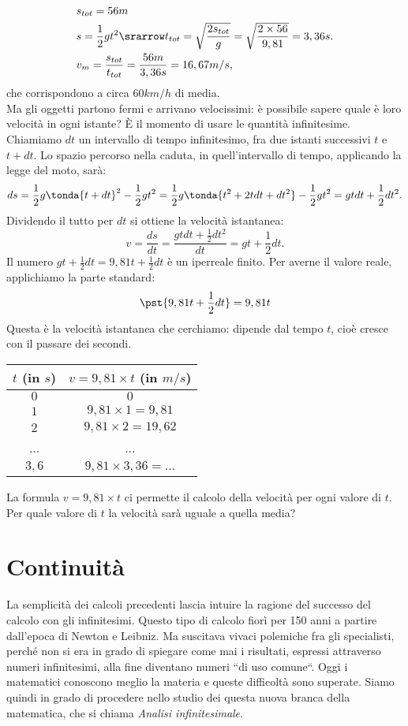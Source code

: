 \begin{align*}
 & s_{tot} = 56m\\
 & s =\frac{1}{2}gt^2 \srarrow t_{tot}= \sqrt{\frac{2s_{tot}}{g}}=
 \sqrt{\frac{2\times 56}{9,81}}=3,36 s.\\
 & v_m= \frac{s_{tot}}{t_{tot}}=\frac{56 m}{3,36 s}=16,67 m/s,
\end{align*}
che corrispondono a circa $60 km/h$ di media.\\
Ma gli oggetti partono fermi e arrivano velocissimi: 
è possibile sapere quale è loro velocità in ogni istante? È il momento
di usare le quantità infinitesime.\\
Chiamiamo $dt$ un intervallo di tempo infinitesimo, fra due istanti successivi
$t$ e $t+dt$.
Lo spazio percorso nella caduta, in quell'intervallo di tempo, applicando la legge del 
moto, sarà:
\[
 ds=\frac{1}{2}g\tonda{t+dt}^2-\frac{1}{2}gt^2=
 \frac{1}{2}g\tonda{t^2+2tdt+dt^2}-\frac{1}{2}gt^2=
 gtdt+\frac{1}{2}dt^2. 
\]
Dividendo il tutto per $dt$ si ottiene la velocità istantanea:
\[
 v=\frac{ds}{dt}=\frac{gtdt+\frac{1}{2}dt^2}{dt}=gt+\frac{1}{2}dt.
\]
Il numero $gt+\frac{1}{2}dt=9,81t+\frac{1}{2}dt$ è un iperreale finito. 
Per averne il valore reale, applichiamo la parte standard:
\[
 \pst{9,81t+\frac{1}{2}dt}=9,81t
\]
Questa è la velocità istantanea che cerchiamo: dipende dal tempo $t$,
cioè cresce con il passare dei secondi. 

\begin{center}
\begin{tabular}{cc}\toprule
$t$ (in $s$) & $v=9,81\times t$ (in $m/s$) \\\midrule
$0$ & $0$  \\
$1$ & $9,81\times 1 =9,81$ \\
$2$ & $9,81\times 2 =19,62$ \\
... & ... \\
$3,6$ & $9,81\times 3,36= ...$\\\bottomrule
\end{tabular}
\label{tab:diff_velocita}
\end{center}

La formula $v=9,81\times t$ ci permette il calcolo della velocità per ogni valore di $t$.
Per quale valore di \(t\) la velocità sarà uguale a quella media? 


\section{Continuità}
\label{04_diffcomtinuità}
La semplicità dei calcoli precedenti lascia intuire la ragione del successo del
calcolo con gli infinitesimi.  Questo tipo di calcolo fiorì per 150 anni a 
partire dall'epoca di Newton e Leibniz. Ma suscitava vivaci polemiche fra
gli specialisti, perché non si era in grado di spiegare come mai i 
risultati, espressi attraverso numeri infinitesimi, alla fine diventano numeri
``di uso comune``.
Oggi i matematici conoscono meglio la materia e queste difficoltà sono superate.
Siamo quindi in grado di procedere nello studio dei questa nuova branca della 
matematica, che si chiama \emph{Analisi infinitesimale}.

